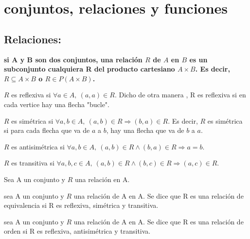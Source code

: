 \chapter{conjuntos, relaciones y funciones}


\section{Relaciones:}

\begin{definicion}
    \textbf {si A y B son dos conjuntos, una relación $R$ de $A$ en $B$ es un subconjunto cualquiera R del producto cartesiano $A \times B$. Es decir, $R \subseteq A \times B$ o $R \in P (A \times B)$.}
\end{definicion}

\begin{teoria}[title=Propiedades de las relaciones]
\begin{listapropiedades}
  \item[Reflexiva] $R$ es reflexiva si $\forall a \in A,\ (a,a)\in R$. Dicho de otra manera , R es reflexiva si en cada vertice hay una flecha "bucle".
  \item[Simétrica] $R$ es simétrica si $\forall a,b \in A,\ (a,b)\in R \Rightarrow (b,a)\in R$. Es decir, $R$ es simétrica si para cada flecha que va de $a$ a $b$, hay una flecha que va de $b$ a $a$.
  \item[Antisimétrica] $R$ es antisimétrica si $\forall a,b \in A,\ (a,b)\in R \wedge (b,a)\in R \Rightarrow a=b$.
  \item[Transitiva] $R$ es transitiva si $\forall a,b,c \in A,\ (a,b)\in R \wedge (b,c)\in R \Rightarrow (a,c)\in R$.
\end{listapropiedades}
\end{teoria}


\begin{teoria}[title=Relación de equivalencia y relación de orden]
  Sea A un conjunto y $R$ una relación en A. 
  \begin{listapropiedades}
    \item[Relación de equivalencia] sea A un conjunto y $R$ una relación de A en A. 
      Se dice que R es una relación de equivalencia si R es reflexiva, simétrica y transitiva.
    \item[Relación de orden] sea A un conjunto y $R$ una relación de A en A. 
      Se dice que R es una relación de orden si R es reflexiva, antisimétrica y transitiva.
  \end{listapropiedades}
\end{teoria}

